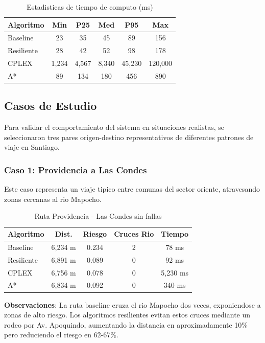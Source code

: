 \documentclass[conference]{IEEEtran}
\begin{document}
\begin{table}[!t]
\centering
\caption{Estadisticas de tiempo de computo (ms)}
\begin{tabular}{@{}lccccc@{}}
\toprule
\textbf{Algoritmo} & \textbf{Min} & \textbf{P25} & \textbf{Med} & \textbf{P95} & \textbf{Max} \\
\midrule
Baseline & 23 & 35 & 45 & 89 & 156 \\
Resiliente & 28 & 42 & 52 & 98 & 178 \\
CPLEX & 1,234 & 4,567 & 8,340 & 45,230 & 120,000 \\
A* & 89 & 134 & 180 & 456 & 890 \\
\bottomrule
\end{tabular}
\end{table}

\subsection{Casos de Estudio}

Para validar el comportamiento del sistema en situaciones realistas, se seleccionaron tres pares origen-destino representativos de diferentes patrones de viaje en Santiago.

\subsubsection{Caso 1: Providencia a Las Condes}

Este caso representa un viaje tipico entre comunas del sector oriente, atravesando zonas cercanas al rio Mapocho.

\begin{table}[!t]
\centering
\caption{Ruta Providencia - Las Condes sin fallas}
\begin{tabular}{@{}lcccc@{}}
\toprule
\textbf{Algoritmo} & \textbf{Dist.} & \textbf{Riesgo} & \textbf{Cruces Rio} & \textbf{Tiempo} \\
\midrule
Baseline & 6,234 m & 0.234 & 2 & 78 ms \\
Resiliente & 6,891 m & 0.089 & 0 & 92 ms \\
CPLEX & 6,756 m & 0.078 & 0 & 5,230 ms \\
A* & 6,834 m & 0.092 & 0 & 340 ms \\
\bottomrule
\end{tabular}
\end{table}

\textbf{Observaciones}: La ruta baseline cruza el rio Mapocho dos veces, exponiendose a zonas de alto riesgo. Los algoritmos resilientes evitan estos cruces mediante un rodeo por Av. Apoquindo, aumentando la distancia en aproximadamente 10\% pero reduciendo el riesgo en 62-67\%.
\end{document}
